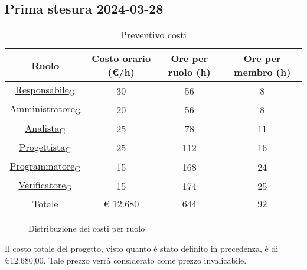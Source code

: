 \subsection{Prima stesura 2024-03-28}
\begin{table}[!h]
	\centering
		\begin{tabular}{ | c | c | c | c | }
			\hline
			\textbf{Ruolo}   & \textbf{Costo orario (€/h)} & \textbf{Ore per ruolo (h)} & \textbf{Ore per membro (h)} \\
			\hline
			\href{https://7last.github.io/docs/pb/documentazione-interna/glossario\#responsabile}{Responsabile\textsubscript{G}}   & 30           & 56            & 8              \\
			\href{https://7last.github.io/docs/pb/documentazione-interna/glossario\#amministratore}{Amministratore\textsubscript{G}} & 20           & 56            & 8              \\
			\href{https://7last.github.io/docs/pb/documentazione-interna/glossario\#analista}{Analista\textsubscript{G}}       & 25           & 78            & 11             \\
			\href{https://7last.github.io/docs/pb/documentazione-interna/glossario\#progettista}{Progettista\textsubscript{G}}    & 25           & 112           & 16             \\
			\href{https://7last.github.io/docs/pb/documentazione-interna/glossario\#programmatore}{Programmatore\textsubscript{G}}  & 15           & 168           & 24             \\
			\href{https://7last.github.io/docs/pb/documentazione-interna/glossario\#verificatore}{Verificatore\textsubscript{G}}   & 15           & 174           & 25             \\
			\hline
			Totale         & € 12.680     & 644           & 92             \\
			\hline
		\end{tabular}
        \caption{Preventivo costi}
\end{table}
\begin{figure}[!h]
    \centering
    \caption{Distribuzione dei costi per ruolo}
\end{figure}
\begin{flushleft}
Il costo totale del progetto, visto quanto è stato definito in precedenza, è di €12.680,00. Tale prezzo verrà considerato come prezzo invalicabile.
\end{flushleft}
